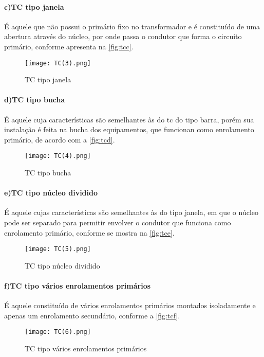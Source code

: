 				\paragraph*{c)\indent TC tipo janela}
					É aquele que não possui o primário fixo no transformador e é constituído de uma abertura através do núcleo, por onde passa o condutor que forma o circuito primário, conforme apresenta na \autoref{fig:tcc}.
					\begin{figure}[htb]
						\caption{TC tipo janela}
						\centering
						\texttt{[image: TC(3).png]}
						\label{fig:tcc}
					\end{figure}
				\paragraph*{d)\indent TC tipo bucha}
					É aquele cuja características são semelhantes às do tc do tipo barra, porém sua instalação é feita na bucha dos equipamentos, que funcionan como enrolamento primário, de acordo com a \autoref{fig:tcd}.
					\begin{figure}[htb]
						\caption{TC tipo bucha}
						\centering
						\texttt{[image: TC(4).png]}
						\label{fig:tcd}
					\end{figure}
				\paragraph*{e)\indent TC tipo núcleo dividido}
					É aquele cujas características são semelhantes às do tipo janela, em que o núcleo pode ser separado para permitir envolver o condutor que funciona como enrolamento primário, conforme se mostra na \autoref{fig:tce}.
					\begin{figure}[htb]
						\caption{TC tipo núcleo dividido}
						\centering
						\texttt{[image: TC(5).png]}
						\label{fig:tce}
					\end{figure}
				\paragraph*{f)\indent TC tipo vários enrolamentos primários}
					É aquele constituído de vários enrolamentos primários montados isoladamente e apenas um enrolamento secundário, conforme a \autoref{fig:tcf}.
					\begin{figure}[htb]
						\caption{TC tipo vários enrolamentos primários}
						\centering
						\texttt{[image: TC(6).png]}
						\label{fig:tcf}
					\end{figure}

